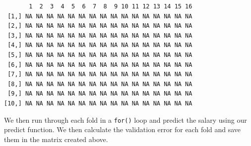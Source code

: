 \documentclass[]{article}
\newenvironment{Shaded}{\begin{snugshade}}{\end{snugshade}}
\newcommand{\CommentTok}[1]{\textcolor[rgb]{0.56,0.35,0.01}{\textit{#1}}}
\newcommand{\ControlFlowTok}[1]{\textcolor[rgb]{0.13,0.29,0.53}{\textbf{#1}}}
\newcommand{\DataTypeTok}[1]{\textcolor[rgb]{0.13,0.29,0.53}{#1}}
\newcommand{\DecValTok}[1]{\textcolor[rgb]{0.00,0.00,0.81}{#1}}
\newcommand{\KeywordTok}[1]{\textcolor[rgb]{0.13,0.29,0.53}{\textbf{#1}}}
\newcommand{\NormalTok}[1]{#1}
\newcommand{\OperatorTok}[1]{\textcolor[rgb]{0.81,0.36,0.00}{\textbf{#1}}}
\newcommand{\StringTok}[1]{\textcolor[rgb]{0.31,0.60,0.02}{#1}}
\begin{document}
\begin{verbatim}
       1  2  3  4  5  6  7  8  9 10 11 12 13 14 15 16
 [1,] NA NA NA NA NA NA NA NA NA NA NA NA NA NA NA NA
 [2,] NA NA NA NA NA NA NA NA NA NA NA NA NA NA NA NA
 [3,] NA NA NA NA NA NA NA NA NA NA NA NA NA NA NA NA
 [4,] NA NA NA NA NA NA NA NA NA NA NA NA NA NA NA NA
 [5,] NA NA NA NA NA NA NA NA NA NA NA NA NA NA NA NA
 [6,] NA NA NA NA NA NA NA NA NA NA NA NA NA NA NA NA
 [7,] NA NA NA NA NA NA NA NA NA NA NA NA NA NA NA NA
 [8,] NA NA NA NA NA NA NA NA NA NA NA NA NA NA NA NA
 [9,] NA NA NA NA NA NA NA NA NA NA NA NA NA NA NA NA
[10,] NA NA NA NA NA NA NA NA NA NA NA NA NA NA NA NA
\end{verbatim}

We then run through each fold in a \texttt{for()} loop and predict the salary using our predict function. We then calculate the validation error for each fold and save them in the matrix created above.

\begin{Shaded}
\end{Shaded}
\end{document}
